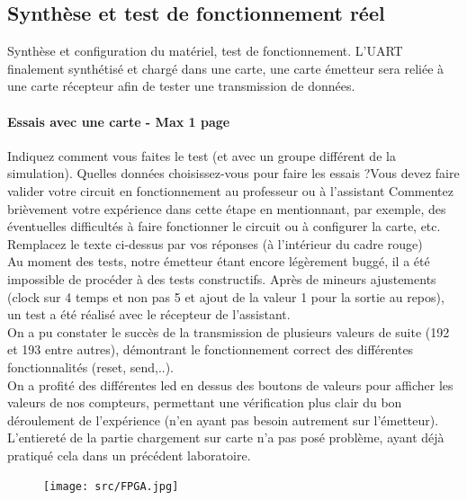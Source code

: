 \documentclass[a4paper]{article} %
\begin{document}
 \subsection{Synthèse et test de fonctionnement réel}
Synthèse et configuration du matériel, test de fonctionnement.
L’UART finalement synthétisé et chargé dans une carte, une carte émetteur sera reliée à une carte récepteur afin de tester une transmission de données.
\begin{tcolorbox}[colframe=Monokaimagenta,colback=white, breakable, enhanced]
\paragraph{Essais avec une carte - Max 1 page}
Indiquez comment vous faites le test (et avec un groupe différent de la simulation). Quelles données choisissez-vous pour faire les essais ?Vous devez faire valider votre circuit en fonctionnement au professeur ou à l’assistant
Commentez brièvement votre expérience dans cette étape en mentionnant, par exemple, des éventuelles difficultés à faire fonctionner le circuit ou à configurer la carte, etc.
Remplacez le texte ci-dessus par vos réponses (à l’intérieur du cadre rouge) \\
Au moment des tests, notre émetteur étant encore légèrement buggé, il a été impossible de procéder à des tests constructifs. Après de mineurs ajustements (clock sur 4 temps et non pas 5 et ajout de la valeur 1 pour la sortie au repos), un test a été réalisé avec le récepteur de l'assistant. \\
On a pu constater le succès de la transmission de plusieurs valeurs de suite (192 et 193 entre autres), démontrant
le fonctionnement correct des différentes fonctionnalités (reset, send,..). \\
On a profité des différentes led en dessus des boutons de valeurs pour afficher les valeurs de nos compteurs, permettant une vérification plus clair du bon déroulement de l'expérience (n'en ayant pas besoin autrement sur l'émetteur).
L'entiereté de la partie chargement sur carte n'a pas posé problème, ayant déjà pratiqué cela dans un précédent laboratoire. 
\begin{figure}[H]
	\centering
	\texttt{[image: src/FPGA.jpg]}
	\label{fig:FPGA}
\end{figure}
\end{tcolorbox}
\end{document}
